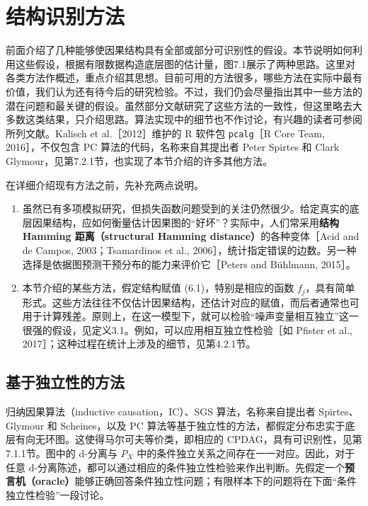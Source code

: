 \FloatBarrier
\section{结构识别方法}

前面介绍了几种能够使因果结构具有全部或部分可识别性的假设。本节说明如何利用这些假设，根据有限数据构造底层图的估计量，图7.1展示了两种思路。这里对各类方法作概述，重点介绍其思想。目前可用的方法很多，哪些方法在实际中最有价值，我们认为还有待今后的研究检验。不过，我们仍会尽量指出其中一些方法的潜在问题和最关键的假设。虽然部分文献研究了这些方法的一致性，但这里略去大多数这类结果，只介绍思路。算法实现中的细节也不作讨论，有兴趣的读者可参阅所列文献。Kalisch et al.［2012］维护的 R 软件包 \texttt{pcalg}［R Core Team, 2016］，不仅包含 PC 算法的代码，名称来自其提出者 Peter Spirtes 和 Clark Glymour，见第7.2.1节，也实现了本节介绍的许多其他方法。

在详细介绍现有方法之前，先补充两点说明。
\begin{enumerate}[label=(\arabic*)]
 \item 虽然已有多项模拟研究，但损失函数问题受到的关注仍然很少。给定真实的底层因果结构，应如何衡量估计因果图的“好坏”？实际中，人们常采用\textbf{结构 Hamming 距离（structural Hamming distance）}的各种变体［Acid and de Campos, 2003；Tsamardinos et al., 2006］，统计指定错误的边数。另一种选择是依据图预测干预分布的能力来评价它［Peters and Bühlmann, 2015］。
 \item 本节介绍的某些方法，假定结构赋值 (6.1)，特别是相应的函数 $f_j$，具有简单形式。这些方法往往不仅估计因果结构，还估计对应的赋值，而后者通常也可用于计算残差。原则上，在这一模型下，就可以检验“噪声变量相互独立”这一很强的假设，见定义3.1。例如，可以应用相互独立性检验［如 Pfister et al., 2017］；这种过程在统计上涉及的细节，见第4.2.1节。
\end{enumerate}



\subsection{基于独立性的方法}

归纳因果算法（inductive causation，IC）、SGS 算法，名称来自提出者 Spirtes、Glymour 和 Scheines，以及 PC 算法等基于独立性的方法，都假定分布忠实于底层有向无环图。这使得马尔可夫等价类，即相应的 CPDAG，具有可识别性，见第7.1.1节。图中的 d-分离与 $P_X$ 中的条件独立关系之间存在一一对应。因此，对于任意 d-分离陈述，都可以通过相应的条件独立性检验来作出判断。先假定一个\textbf{预言机（oracle）}能够正确回答条件独立性问题；有限样本下的问题将在下面“条件独立性检验”一段讨论。

